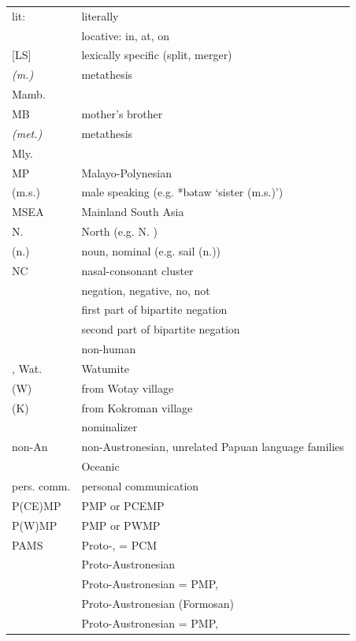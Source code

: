 {\begin{xltabular}{\textwidth}[l]{l>{\raggedright\arraybackslash}X}
lit:	&	literally	\\
	&	locative: in, at, on	\\
{[LS]}	&	lexically specific (split, merger)	\\
\it{(m.)}	&	metathesis	\\
Mamb.	&		\\
MB	&	mother's brother	\\
\it{(met.)}	&	metathesis	\\	
Mly.	&	 \\	
MP	&	Malayo-Polynesian	\\
(m.s.)	&	male speaking (e.g. *bətaw ‘sister (m.s.)’)	\\
MSEA	&	Mainland South Asia	\\
N.	&	North (e.g. N. )	\\
(n.)	&	noun, nominal (e.g. sail (n.))	\\
NC	&	nasal-consonant cluster	\\
	&	negation, negative, no, not	\\
	&	first part of bipartite negation	\\
	&	second part of bipartite negation	\\
	&	non-human 	\\
, Wat.	&	Watumite 	\\
 (W)	&	 from Wotay village	\\
 (K)	&	 from Kokroman village	\\
	&	nominalizer	\\
non-An	&	non-Austronesian, unrelated Papuan language families	\\
	&	Oceanic	\\
pers. comm.	&	personal communication	\\
P(CE)MP	&	PMP or PCEMP	\\
P(W)MP	&	PMP or PWMP	\\
PAMS	&	Proto-, \citet{Stresemann1927} = PCM	\\
	&	Proto-Austronesian	\\
	&	Proto-Austronesian = PMP, \citet{Dempwolff1938}	\\
	&	Proto-Austronesian (Formosan)	\\
	&	Proto-Austronesian = PMP, \citet{Stresemann1927}	\\

\end{xltabular}}
